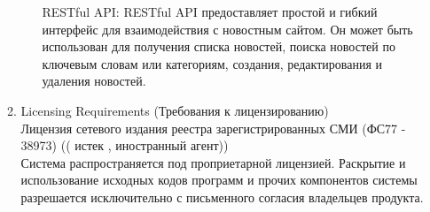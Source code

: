 \begin{enumerate}
\begin{enumerate}[label=3.\arabic*]
\begin{enumerate}[label=3.6.\arabic*]
            RESTful API: RESTful API предоставляет простой и гибкий интерфейс для взаимодействия с новостным сайтом.
            Он может быть использован для получения списка новостей, поиска новостей по ключевым словам или категориям,
            создания, редактирования и удаления новостей.\\
        \end{enumerate}
        \item Licensing Requirements (Требования к лицензированию) \\
        \BgThispage
        Лицензия сетевого издания реестра зарегистрированных СМИ (ФС77 - 38973) (( истек , иностранный агент)) \\
        Система распространяется под проприетарной лицензией. Раскрытие и использование исходных кодов программ и прочих компонентов системы разрешается исключительно с письменного согласия владельцев продукта.
    \end{enumerate}
\end{enumerate}
\newpage
\BgThispage
